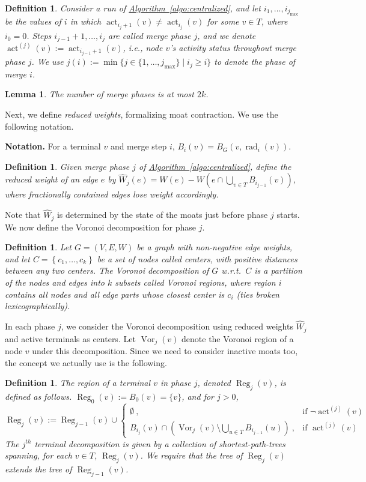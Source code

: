 \documentclass[letterpaper,11pt]{article}
\newtheorem{lemma}[theorem]{Lemma}
\newtheorem{definition}[theorem]{Definition}
\newcommand{\namedref}[2]{\hyperref[#2]{#1~\ref*{#2}}}
\newcommand{\algref}[1]{\namedref{Algorithm}{#1}}
\newcommand{\Set}[1]{\left\{#1\right\}}
\DeclareMathOperator{\act}{act}
\DeclareMathOperator{\moat}{rad}
\DeclareMathOperator{\reg}{Reg}
\DeclareMathOperator{\vor}{Vor}
\def\rW{\hat{W}}
\begin{document}
\begin{definition}\label{def:merge}
Consider a run of \algref{algo:centralized}, and let 
  $i_1,\ldots,i_{j_{\max}}$ be the values of $i$ in which $\act_{i_j+1}(v)\neq
  \act_{i_j}(v)$ for some $v\in T$, where $i_0=0$. Steps
  $i_{j-1}+1,\ldots,i_j$ are called \emph{merge phase $j$}, and we denote
  $\act^{(j)}(v):=\act_{i_{j-1}+1}(v)$, i.e., node $v$'s activity status
  throughout merge phase $j$. We use $j(i):=\min \{j\in
  \{1,\ldots,j_{\max}\}\mid i_j\geq i\}$ to denote the \emph{phase of merge
  $i$}.
\end{definition}
\begin{lemma}\label{lem-numphases}
  The number of merge phases is at most $2k$. 
\end{lemma}
Next, we define \emph{reduced weights}, formalizing moat contraction.
We use the following notation.

\smallskip\noindent\textbf{Notation.} For a terminal $v$ and merge step $i$, 
$B_i(v)= B_G(v,\moat_{i}(v))$.

\begin{definition}Given merge phase $j$ of \algref{algo:centralized}, define the
  \emph{reduced weight} of an edge $e$ by $\rW_j(e)=W(e)-W(e\cap
  \bigcup_{v\in T}B_{i_{j-1}}(v))$, where fractionally contained edges lose
  weight accordingly.
\end{definition}
Note that $\hat W_j$ is determined by the state of the moats just
before phase $j$ starts. We now define the Voronoi decomposition for phase $j$.
\begin{definition}
  Let $G=(V,E,W)$ be a graph with non-negative edge weights, and let
  $C=\Set{c_1,\ldots,c_k}$ be a set of nodes called \emph{centers},
  with positive distances
  between any two centers. The \emph{Voronoi decomposition} of $G$ w.r.t.\ $C$
  is a partition of the nodes and edges into $k$ subsets called \emph{Voronoi
  regions}, where region $i$ contains all nodes and all edge parts
  whose closest center is $c_i$ (ties broken lexicographically).
\end{definition}

In each phase $j$, we consider the Voronoi decomposition using reduced
weights $\hat W_j$ and active terminals
as centers. Let $\vor_j(v)$ denote
the Voronoi region of a node $v$ under this decomposition.
Since we need to consider inactive moats too,  the concept we actually
use is the following. 
\begin{definition}
  The \emph{region} of a
  terminal $v$ in phase $j$, denoted $\reg_j(v)$, is defined as
  follows. 
  $\reg_0(v):=B_0(v)=\{v\}$, and for $j>0$,
$$
\reg_j(v):=\reg_{j-1}(v)\cup
\begin{cases}
  \emptyset~,&\text{if } \neg\act^{(j)}(v)\\
  B_{i_j}(v)\cap\left(\vor_j(v)\setminus \bigcup_{u\in
      T}B_{i_{j-1}}(u)\right)~,&\text{if }\act^{(j)}(v)
\end{cases}
$$
The $j^{th}$ terminal decomposition is given by a collection of
shortest-path-trees spanning, for each $v\in T$, $\reg_j(v)$. We require that
the tree of $\reg_{j}(v)$ extends the tree of $\reg_{j-1}(v)$.
\end{definition}
\end{document}
